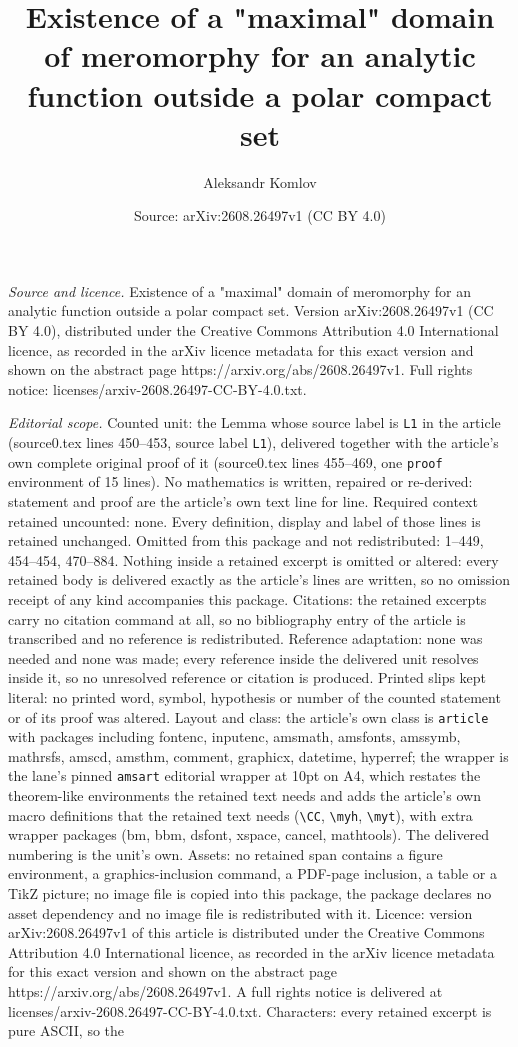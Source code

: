 \documentclass[10pt,a4paper]{amsart}
\title[Existence of a "maximal" domain of meromorphy for an analyti]{Existence of a "maximal" domain of meromorphy for an analytic function outside a polar compact set}
\author{Aleksandr Komlov}
\date{Source: arXiv:2608.26497v1 (CC BY 4.0)}
\begin{document}
\maketitle

\noindent\emph{Source and licence.} Existence of a "maximal" domain of meromorphy for an analytic function outside a polar compact set. Version arXiv:2608.26497v1 (CC BY 4.0), distributed under the Creative Commons Attribution 4.0 International licence, as recorded in the arXiv licence metadata for this exact version and shown on the abstract page https://arxiv.org/abs/2608.26497v1. Full rights notice: licenses/arxiv-2608.26497-CC-BY-4.0.txt.\par\smallskip

\noindent\textit{Editorial scope.} Counted unit: the Lemma whose source label is \texttt{L1} in the article (source0.tex lines 450--453, source label \texttt{L1}), delivered together with the article's own complete original proof of it (source0.tex lines 455--469, one \texttt{proof} environment of 15 lines). No mathematics is written, repaired or re-derived: statement and proof are the article's own text line for line. Required context retained uncounted: none. Every definition, display and label of those lines is retained unchanged. Omitted from this package and not redistributed: 1--449, 454--454, 470--884. Nothing inside a retained excerpt is omitted or altered: every retained body is delivered exactly as the article's lines are written, so no omission receipt of any kind accompanies this package. Citations: the retained excerpts carry no citation command at all, so no bibliography entry of the article is transcribed and no reference is redistributed. Reference adaptation: none was needed and none was made; every reference inside the delivered unit resolves inside it, so no unresolved reference or citation is produced. Printed slips kept literal: no printed word, symbol, hypothesis or number of the counted statement or of its proof was altered. Layout and class: the article's own class is \texttt{article} with packages including fontenc, inputenc, amsmath, amsfonts, amssymb, mathrsfs, amscd, amsthm, comment, graphicx, datetime, hyperref; the wrapper is the lane's pinned \texttt{amsart} editorial wrapper at 10pt on A4, which restates the theorem-like environments the retained text needs and adds the article's own macro definitions that the retained text needs (\texttt{\textbackslash CC}, \texttt{\textbackslash myh}, \texttt{\textbackslash myt}), with extra wrapper packages (bm, bbm, dsfont, xspace, cancel, mathtools). The delivered numbering is the unit's own. Assets: no retained span contains a figure environment, a graphics-inclusion command, a PDF-page inclusion, a table or a TikZ picture; no image file is copied into this package, the package declares no asset dependency and no image file is redistributed with it. Licence: version arXiv:2608.26497v1 of this article is distributed under the Creative Commons Attribution 4.0 International licence, as recorded in the arXiv licence metadata for this exact version and shown on the abstract page https://arxiv.org/abs/2608.26497v1. A full rights notice is delivered at licenses/arxiv-2608.26497-CC-BY-4.0.txt. Characters: every retained excerpt is pure ASCII, so the 
\end{document}
